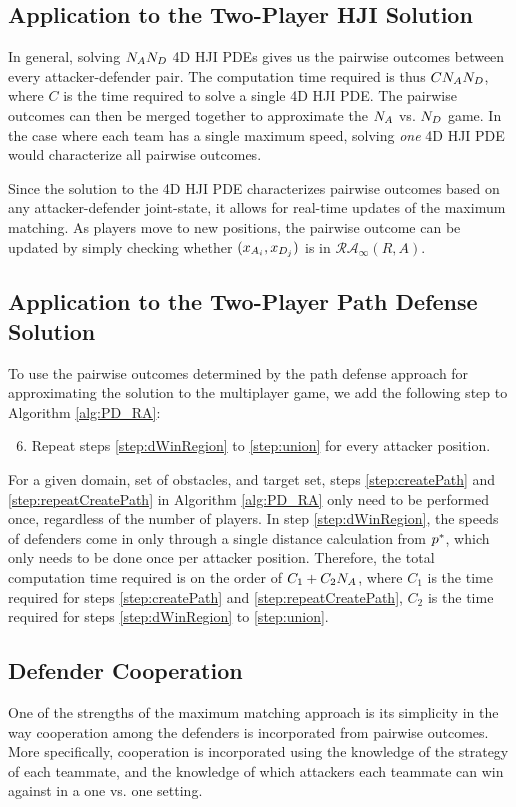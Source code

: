 \subsection{Application to the Two-Player HJI Solution}
\label{subusec:MMHJI}
In general, solving $N_AN_D$ 4D HJI PDEs gives us the pairwise outcomes between every attacker-defender pair. The computation time required is thus $C N_AN_D$, where $C$ is the time required to solve a single 4D HJI PDE. The pairwise outcomes can then be merged together to approximate the $N_A$ vs. $N_D$ game. In the case where each team has a single maximum speed, solving \textit{one} 4D HJI PDE would characterize all pairwise outcomes.

Since the solution to the 4D HJI PDE characterizes pairwise outcomes based on any attacker-defender joint-state, it allows for real-time updates of the maximum matching. As players move to new positions, the pairwise outcome can be updated by simply checking whether $(x_{A_{i}}, x_{D_{j}})$ is in $\mathcal{RA}_\infty(R,A)$.

\subsection{Application to the Two-Player Path Defense Solution}
\label{subsec:MMPD}
To use the pairwise outcomes determined by the path defense approach for approximating the solution to the multiplayer game, we add the following step to Algorithm \ref{alg:PD_RA}: 
\begin{enumerate}
\setcounter{enumi}{5}
\item Repeat steps \ref{step:dWinRegion} to \ref{step:union} for every attacker position.
\end{enumerate}

For a given domain, set of obstacles, and target set, steps \ref{step:createPath} and \ref{step:repeatCreatePath} in Algorithm \ref{alg:PD_RA} only need to be performed once, regardless of the number of players. In step \ref{step:dWinRegion}, the speeds of defenders come in only through a single distance calculation from $p^*$, which only needs to be done once per attacker position. Therefore, the total computation time required is on the order of $C_1 + C_2 N_A$, where $C_1$ is the time required for steps \ref{step:createPath} and \ref{step:repeatCreatePath}, $C_2$ is the time required for steps \ref{step:dWinRegion} to \ref{step:union}. 

\subsection{Defender Cooperation}
One of the strengths of the maximum matching approach is its simplicity in the way cooperation among the defenders is incorporated from pairwise outcomes. More specifically, cooperation is incorporated using the knowledge of the strategy of each teammate, and the knowledge of which attackers each teammate can win against in a one vs. one setting. 

